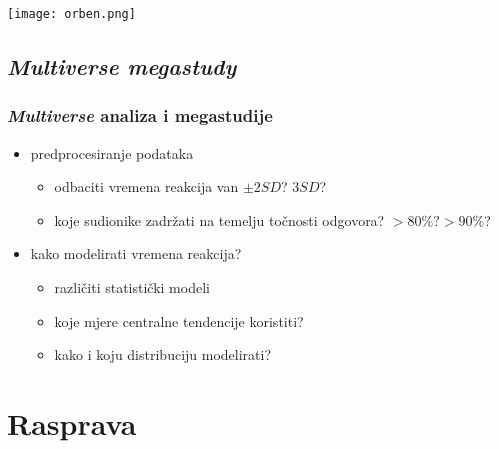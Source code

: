 \documentclass{beamer}
\newcommand{\tinycitep}[1]{%
    \bgroup
    \scriptsize
    \citep{#1}
    \egroup}
\begin{document}
\begin{frame}
    \centering
    \texttt{[image: orben.png]}

    \tinycitep{orbenAssociationAdolescentWellbeing2019}
\end{frame}

\subsection{\textit{Multiverse megastudy}}

\begin{frame}
    \frametitle{\textit{Multiverse} analiza i megastudije}

    \begin{itemize}
        \item predprocesiranje podataka
            \begin{itemize}
                \item odbaciti vremena reakcija van \(\pm 2 SD\)? \(3 SD\)?
                \item koje sudionike zadržati na temelju točnosti odgovora?
                    \(>80\%? >90\%\)?
            \end{itemize}

        \pause

        \item kako modelirati vremena reakcija?
            \begin{itemize}
                \item različiti statistički modeli

                \pause

                \item koje mjere centralne tendencije koristiti?
                    \tinycitep{rousseletReactionTimesOther2020}

                \pause

                \item kako i koju distribuciju modelirati?
                    \tinycitep{balotaMovingMeanStudies2011}

            \end{itemize}
    \end{itemize}
\end{frame}

\section{Rasprava}
\end{document}
